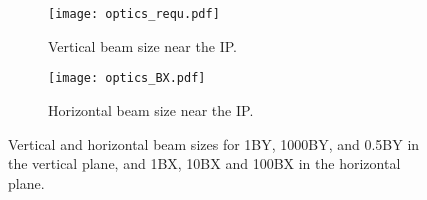 {{\begin{figure}[htb]
 \begin{center}
 \hspace*{-1cm}
 \begin{subfigure}[b]{0.45\textwidth}
  \texttt{[image: optics\_requ.pdf]}\caption{Vertical beam size near the IP.}\label{f:opticsBY}
 \end{subfigure}\hspace{0.5cm}
\begin{subfigure}[b]{0.45\textwidth}
  \texttt{[image: optics\_BX.pdf]}\caption{Horizontal beam size near the IP.}\label{f:opticsBX}
 \end{subfigure}
  \caption{Vertical and horizontal beam sizes for 1BY, 1000BY, and 0.5BY in the vertical plane, and 1BX, 10BX and 100BX in the horizontal plane.}\label{f:BXYoptics}
 \end{center}
\end{figure}

}}
